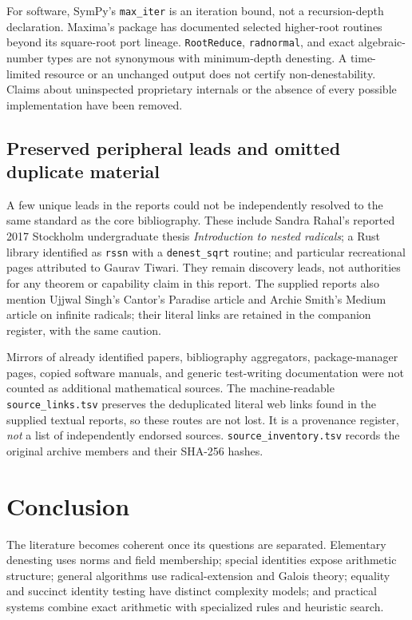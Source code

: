 \documentclass[11pt,oneside]{article}
\numberwithin{equation}{section}
\theoremstyle{definition}
\theoremstyle{remark}
\begin{document}
For software, SymPy's \texttt{max\_iter} is an iteration bound, not a recursion-depth declaration. Maxima's package has documented selected higher-root routines beyond its square-root port lineage. \texttt{RootReduce}, \texttt{radnormal}, and exact algebraic-number types are not synonymous with minimum-depth denesting. A time-limited resource or an unchanged output does not certify non-denestability. Claims about uninspected proprietary internals or the absence of every possible implementation have been removed.

\subsection{Preserved peripheral leads and omitted duplicate material}\label{sec:peripheral}
A few unique leads in the reports could not be independently resolved to the same standard as the core bibliography. These include Sandra Rahal's reported 2017 Stockholm undergraduate thesis \emph{Introduction to nested radicals}; a Rust library identified as \texttt{rssn} with a \texttt{denest\_sqrt} routine; and particular recreational pages attributed to Gaurav Tiwari. They remain discovery leads, not authorities for any theorem or capability claim in this report. The supplied reports also mention Ujjwal Singh's Cantor's Paradise article and Archie Smith's Medium article on infinite radicals; their literal links are retained in the companion register, with the same caution.

Mirrors of already identified papers, bibliography aggregators, package-manager pages, copied software manuals, and generic test-writing documentation were not counted as additional mathematical sources. The machine-readable \texttt{source\_links.tsv} preserves the deduplicated literal web links found in the supplied textual reports, so these routes are not lost. It is a provenance register, \emph{not} a list of independently endorsed sources. \texttt{source\_inventory.tsv} records the original archive members and their SHA-256 hashes.

\section{Conclusion}
The literature becomes coherent once its questions are separated. Elementary denesting uses norms and field membership; special identities expose arithmetic structure; general algorithms use radical-extension and Galois theory; equality and succinct identity testing have distinct complexity models; and practical systems combine exact arithmetic with specialized rules and heuristic search.
\end{document}
